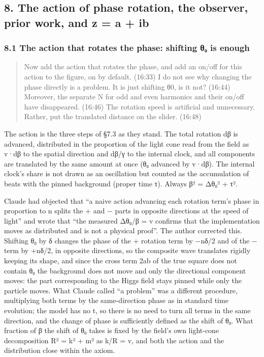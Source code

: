 \documentclass[
  a4paper,
]{article}
\begin{document}
\subsection{8. The action of phase rotation, the observer, prior work,
and z = a +
ib}\label{the-action-of-phase-rotation-the-observer-prior-work-and-z-a-ib}

\subsubsection{8.1 The action that rotates the phase: shifting θ₀ is
enough}\label{the-action-that-rotates-the-phase-shifting-ux3b8ux2080-is-enough}

\begin{quote}
Now add the action that rotates the phase, and add an on/off for this
action to the figure, on by default. (16:33) I do not see why changing
the phase directly is a problem. It is just shifting θ0, is it not?
(16:44) Moreover, the separate N for odd and even harmonics and their
on/off have disappeared. (16:46) The rotation speed is artificial and
unnecessary. Rather, put the translated distance on the slider. (16:48)
\end{quote}

The action is the three steps of §7.3 as they stand. The total rotation
dβ is advanced, distributed in the proportion of the light cone read
from the field as v·dβ to the spatial direction and dβ/γ to the internal
clock, and all components are translated by the same amount at once (θ₀
advanced by v·dβ). The internal clock's share is not drawn as an
oscillation but counted as the accumulation of beats with the pinned
background (proper time τ). Always β² = Δθ₀² + τ².

Claude had objected that ``a naive action advancing each rotation term's
phase in proportion to n splits the + and − parts in opposite directions
at the speed of light'' and wrote that ``the measured Δθ₀/β = v confirms
that the implementation moves as distributed and is not a physical
proof''. The author corrected this. Shifting θ₀ by δ changes the phase
of the + rotation term by −nδ/2 and of the − term by +nδ/2, in opposite
directions, so the composite wave translates rigidly keeping its shape,
and since the cross term 2ab of the true square does not contain θ₀ the
background does not move and only the directional component moves: the
part corresponding to the Higgs field stays pinned while only the
particle moves. What Claude called ``a problem'' was a different
procedure, multiplying both terms by the same-direction phase as in
standard time evolution; the model has no t, so there is no need to turn
all terms in the same direction, and the change of phase is sufficiently
defined as the shift of θ₀. What fraction of β the shift of θ₀ takes is
fixed by the field's own light-cone decomposition R² = k² + m² as k/R =
v, and both the action and the distribution close within the axiom.
\end{document}
